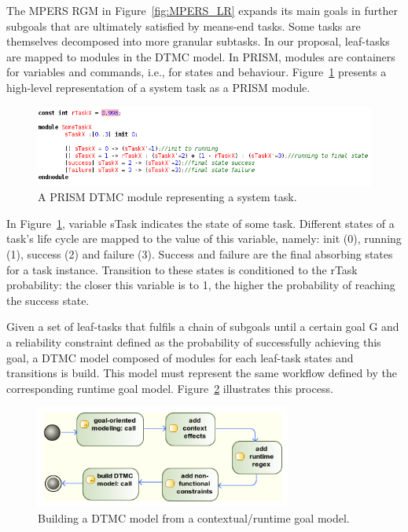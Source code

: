 The MPERS RGM in Figure~\ref{fig:MPERS_LR} expands its main goals in further subgoals that are ultimately satisfied by means-end tasks. Some tasks are themselves decomposed into more granular subtasks. In our proposal, leaf-tasks are mapped to modules in the DTMC model. In PRISM, modules are containers for variables and commands, i.e., for states and behaviour. Figure~\ref{fig:PRISM_TASK_MODULE} presents a high-level representation of a system task as a PRISM module.

\begin{figure}[ht]
\centering
\includegraphics[width=1\textwidth]{imgs/PRISM_TASK_MODULE.png}
\caption{A PRISM DTMC module representing a system task.}
\label{fig:PRISM_TASK_MODULE}
\end{figure}

In Figure~\ref{fig:PRISM_TASK_MODULE}, variable sTask indicates the state of some task. Different states of a task's life cycle are mapped to the value of this variable, namely: init (0), running (1), success (2) and failure (3). Success and failure are the final absorbing states for a task instance. Transition to these states is conditioned to the rTask probability: the closer this variable is to 1, the higher the probability of reaching the success state. 

Given a set of leaf-tasks that fulfils a chain of subgoals until a certain goal G and a reliability constraint defined as the probability of successfully achieving this goal, a DTMC model composed of modules for each leaf-task states and transitions is build. This model must represent the same workflow defined by the corresponding runtime goal model. Figure~\ref{fig:CRGM_TO_DTMC} illustrates this process.

\begin{figure}[ht]
\centering
\includegraphics[width=0.75\textwidth]{imgs/CRGM_TO_DTMC.png}
\caption{Building a DTMC model from a contextual/runtime goal model.}
\label{fig:CRGM_TO_DTMC}
\end{figure}

